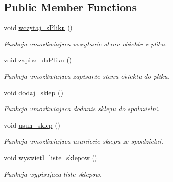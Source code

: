 \subsection*{Public Member Functions}
\begin{DoxyCompactItemize}
\item 
\hypertarget{class_miejska_a4bb8515d8f11cad4257d2a02b7bd1281}{}void \hyperlink{class_miejska_a4bb8515d8f11cad4257d2a02b7bd1281}{wczytaj\+\_\+z\+Pliku} ()\label{class_miejska_a4bb8515d8f11cad4257d2a02b7bd1281}

\begin{DoxyCompactList}\small\item\em Funkcja umozliwiajaca wczytanie stanu obiektu z pliku. \end{DoxyCompactList}\item 
\hypertarget{class_miejska_af1f040b536e345773ed2928b2bf1e4ab}{}void \hyperlink{class_miejska_af1f040b536e345773ed2928b2bf1e4ab}{zapisz\+\_\+do\+Pliku} ()\label{class_miejska_af1f040b536e345773ed2928b2bf1e4ab}

\begin{DoxyCompactList}\small\item\em Funkcja umozliwiajaca zapisanie stanu obiektu do pliku. \end{DoxyCompactList}\item 
\hypertarget{class_miejska_a65dd0667980bf5acba0bedfaccc4c3d0}{}void \hyperlink{class_miejska_a65dd0667980bf5acba0bedfaccc4c3d0}{dodaj\+\_\+sklep} ()\label{class_miejska_a65dd0667980bf5acba0bedfaccc4c3d0}

\begin{DoxyCompactList}\small\item\em Funkcja umozliwiajaca dodanie sklepu do spoldzielni. \end{DoxyCompactList}\item 
\hypertarget{class_miejska_a20d6ce9ea02e64a5d7f56a5cf68cd805}{}void \hyperlink{class_miejska_a20d6ce9ea02e64a5d7f56a5cf68cd805}{usun\+\_\+sklep} ()\label{class_miejska_a20d6ce9ea02e64a5d7f56a5cf68cd805}

\begin{DoxyCompactList}\small\item\em Funkcja umozliwiajaca usuniecie sklepu ze spoldzielni. \end{DoxyCompactList}\item 
\hypertarget{class_miejska_a373f0c2f745c62ffaa281a2acfa87b2e}{}void \hyperlink{class_miejska_a373f0c2f745c62ffaa281a2acfa87b2e}{wyswietl\+\_\+liste\+\_\+sklepow} ()\label{class_miejska_a373f0c2f745c62ffaa281a2acfa87b2e}

\begin{DoxyCompactList}\small\item\em Funkcja wypisujaca liste sklepow. \end{DoxyCompactList}\end{DoxyCompactItemize}
